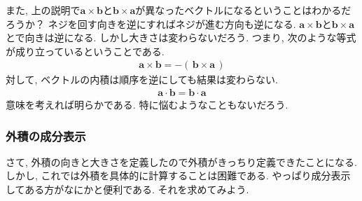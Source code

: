 また, 上の説明で$\bm{a} \times \bm{b}$と$\bm{b} \times \bm{a}$が異なったベクトルになるということはわかるだろうか？ 
ネジを回す向きを逆にすればネジが進む方向も逆になる. 
$\bm{a} \times \bm{b}$と$\bm{b} \times \bm{a}$とで向きは逆になる. しかし大きさは変わらないだろう. 
つまり, 次のような等式が成り立っているということである. 
\begin{eqnarray}
\bm{a} \times \bm{b} = - ( \, \bm{b} \times \bm{a} \, ) 
\label{eq:gaisekihantaisyou}
\end{eqnarray}
対して, ベクトルの内積は順序を逆にしても結果は変わらない. 
\begin{eqnarray}
\bm{a} \cdot \bm{b} = \bm{b} \cdot \bm{a}
\label{eq:naisekitaisyou}
\end{eqnarray}
意味を考えれば明らかである. 特に悩むようなこともないだろう. 

\subsubsection{外積の成分表示}
さて, 外積の向きと大きさを定義したので外積がきっちり定義できたことになる. 
しかし, これでは外積を具体的に計算することは困難である. 
やっぱり成分表示してある方がなにかと便利である. それを求めてみよう. 

